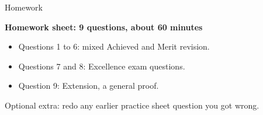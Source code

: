 \documentclass[aspectratio=169,11pt,t,xcolor=table]{beamer}
\begin{document}
\begin{frame}{Homework}\relax
{\sEmph\bfseries Homework sheet: 9 questions, about 60 minutes\par}
\vskip4mm
\begin{itemize}
\item Questions 1 to 6: mixed Achieved and Merit revision.
\item Questions 7 and 8: Excellence exam questions.
\item Question 9: Extension, a general proof.
\end{itemize}
\vskip4mm
Optional extra: redo any earlier practice sheet question you got wrong.
\end{frame}
\end{document}
